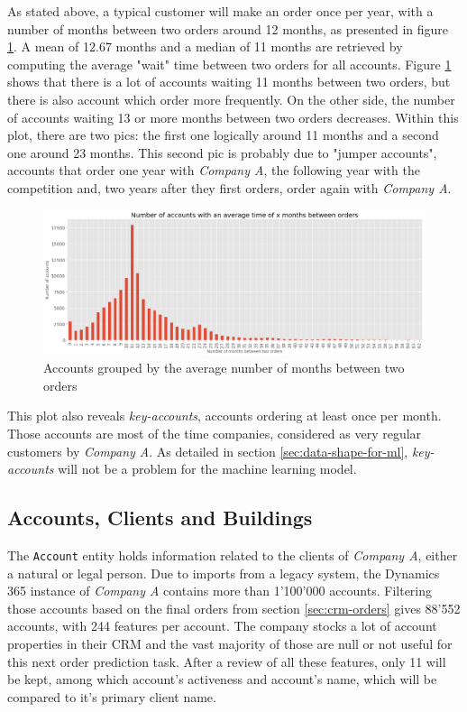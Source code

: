 As stated above, a typical customer will make an order once per year, with a number of months between two orders around 12 months, as presented in figure \ref{fig:orders-account-counts}. A mean of 12.67 months and a median of 11 months are retrieved by computing the average "wait" time between two orders for all accounts. Figure \ref{fig:orders-account-counts} shows that there is a lot of accounts waiting 11 months between two orders, but there is also account which order more frequently. On the other side, the number of accounts waiting 13 or more months between two orders decreases. Within this plot, there are two pics: the first one logically around 11 months and a second one around 23 months. This second pic is probably due to "jumper accounts", accounts that order one year with \textit{Company A}, the following year with the competition and, two years after they first orders, order again with \textit{Company A}. 

\begin{figure}[h]
    \centering
    \includegraphics[width=15cm]{images/accounts-average-time-orders.png}
    \caption{Accounts grouped by the average number of months between two orders}
    \label{fig:orders-account-counts}
\end{figure}

This plot also reveals \textit{key-accounts}, accounts ordering at least once per month. Those accounts are most of the time companies, considered as very regular customers by \textit{Company A}. As detailed in section \ref{sec:data-shape-for-ml}, \textit{key-accounts} will not be a problem for the machine learning model.


\subsection{Accounts, Clients and Buildings}\label{sec:crm-accounts}
The \texttt{Account} entity holds information related to the clients of \textit{Company A}, either a natural or legal person. Due to imports from a legacy system, the Dynamics 365 instance of \textit{Company A} contains more than 1'100'000 accounts. Filtering those accounts based on the final orders from section \ref{sec:crm-orders} gives 88'552 accounts, with 244 features per account. The company stocks a lot of account properties in their CRM and the vast majority of those are null or not useful for this next order prediction task. After a review of all these features, only 11 will be kept, among which account's activeness and account's name, which will be compared to it's primary client name.

